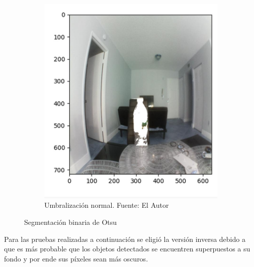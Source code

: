 \begin{figure}[H]
\begin{subfigure}[b]{0.4\textwidth}
        \includegraphics[scale=0.31]{Recursos/umbral_normal.jpg}
        \caption[Umbralización normal.]{Umbralización normal. {\footnotesize Fuente: El Autor}}
        \label{otsu_normal}
     \end{subfigure}
\caption{Segmentación binaria de Otsu}
\label{OTSU_segmentation}
\end{figure}
Para las pruebas realizadas a continuación se eligió la versión inversa debido a que es más probable que los objetos detectados se encuentren superpuestos a su fondo y por ende sus píxeles sean más oscuros.

